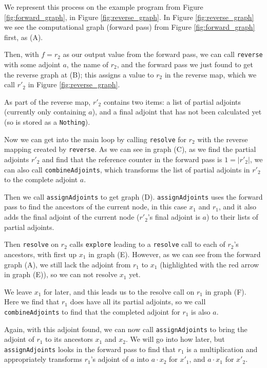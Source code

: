         We represent this process on the example program from Figure \ref{fig:forward_graph}, in Figure \ref{fig:reverse_graph}.
        In Figure \ref{fig:reverse_graph} we see the computational graph (forward pass) from Figure \ref{fig:forward_graph} first, as (A).

        Then, with $f=r_2$ as our output value from the forward pass, we can call \texttt{reverse} with some adjoint $a$, the name of $r_2$, and the forward pass we just found to get the reverse graph at (B); this assigns a value to $r_2$ in the reverse map, which we call $r'_2$ in Figure \ref{fig:reverse_graph}.

        As part of the reverse map, $r'_2$ contains two items: a list of partial adjoints (currently only containing $a$), and a final adjoint that has not been calculated yet (so is stored as a \texttt{Nothing}).

        Now we can get into the main loop by calling \texttt{resolve} for $r_2$ with the reverse mapping created by \texttt{reverse}.
        As we can see in graph (C), as we find the partial adjoints $r'_2$ and find that the reference counter in the forward pass is $1=|r'_2|$, we can also call \texttt{combineAdjoints}, which transforms the list of partial adjoints in $r'_2$ to the complete adjoint $a$.

        Then we call \texttt{assignAdjoints} to get graph (D).
        \texttt{assignAdjoints} uses the forward pass to find the ancestors of the current node, in this case $x_1$ and $r_1$, and it also adds the final adjoint of the current node ($r'_2$'s final adjoint is $a$) to their lists of partial adjoints.

        Then \texttt{resolve} on $r_2$ calls \texttt{explore} leading to a \texttt{resolve} call to each of $r_2$'s ancestors, with first up $x_1$ in graph (E).
        However, as we can see from the forward graph (A), we still lack the adjoint from $r_1$ to $x_1$ (highlighted with the red arrow in graph (E)), so we can not resolve $x_1$ yet.

        We leave $x_1$ for later, and this leads us to the resolve call on $r_1$ in graph (F).
        Here we find that $r_1$ does have all its partial adjoints, so we call \texttt{combineAdjoints} to find that the completed adjoint for $r_1$ is also $a$.

        Again, with this adjoint found, we can now call \texttt{assignAdjoints} to bring the adjoint of $r_1$ to its ancestors $x_1$ and $x_2$.
        We will go into how later, but \texttt{assignAdjoints} looks in the forward pass to find that $r_1$ is a multiplication and appropriately transforms $r_1$'s adjoint of $a$ into $a\cdot x_2$ for $x'_1$, and $a\cdot x_1$ for $x'_2$.

